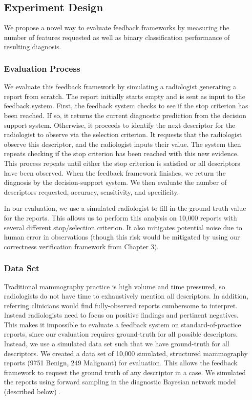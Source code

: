 \subsection{Experiment Design}
We propose a novel way to evaluate feedback frameworks by measuring the number of features requested as well as binary classification performance of resulting diagnosis.

\subsubsection{Evaluation Process}
We evaluate this feedback framework by simulating a radiologist generating a report from scratch.
The report initially starts empty and is sent as input to the feedback system.
First, the feedback system checks to see if the stop criterion has been reached.
If so, it returns the current diagnostic prediction from the decision support system.
Otherwise, it proceeds to identify the next descriptor for the radiologist to observe via the selection criterion.
It requests that the radiologist observe this descriptor, and the radiologist inputs their value.
The system then repeats checking if the stop criterion has been reached with this new evidence.
This process repeats until either the stop criterion is satisfied or all descriptors have been observed.
When the feedback framework finishes, we return the diagnosis by the decision-support system.
We then evaluate the number of descriptors requested, accuracy, sensitivity, and specificity.

In our evaluation, we use a simulated radiologist to fill in the ground-truth value for the reports.
This allows us to perform this analysis on 10,000 reports with several different stop/selection criterion.
It also mitigates potential noise due to human error in observations (though this risk would be mitigated by using our correctness verification framework from Chapter 3).


\subsubsection{Data Set}
Traditional mammography practice is high volume and time pressured, so radiologists do not have time to exhaustively mention all descriptors.
In addition, referring clinicians would find fully-observed reports cumbersome to interpret.
Instead radiologists need to focus on positive findings and pertinent negatives.
This makes it impossible to evaluate a feedback system on standard-of-practice reports, since our evaluation requires ground-truth for all possible descriptors.
Instead, we use a simulated data set such that we have ground-truth for all descriptors.
We created a data set of 10,000 simulated, structured mammography reports (9751 Benign, 249 Malignant) for evaluation.
This allows the feedback framework to request the ground truth of any descriptor in a case.
We simulated the reports using forward sampling in the diagnostic Bayesian network model (described below) \cite{Koller:2009wk}.


